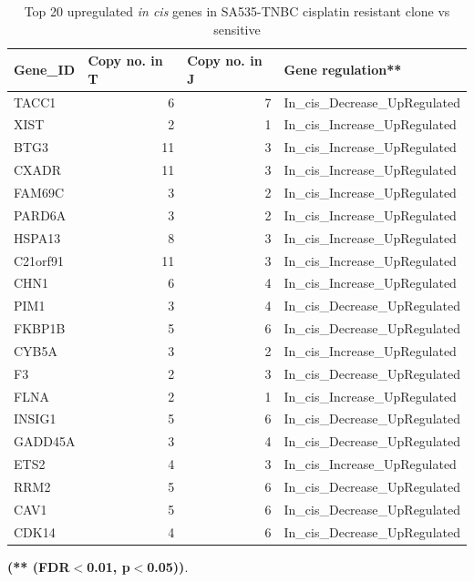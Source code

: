 
 \begin{table}[htbp]
   \centering
   \caption{Top 20 upregulated \textit{in cis} genes in SA535-TNBC cisplatin resistant clone vs sensitive}
     \begin{tabular}{|l|r|r|l|}
     \hline
     \textbf{Gene\_ID} & \multicolumn{1}{|l|}{\textbf{Copy no. in T}} & \multicolumn{1}{|l|}{\textbf{Copy no. in J}} & \textbf{Gene regulation**} \\
     \hline
     TACC1 & 6 & 7 & In\_cis\_Decrease\_UpRegulated \\
     XIST & 2 & 1 & In\_cis\_Increase\_UpRegulated \\
     BTG3 & 11 & 3 & In\_cis\_Increase\_UpRegulated \\
     CXADR & 11 & 3 & In\_cis\_Increase\_UpRegulated \\
     FAM69C & 3 & 2 & In\_cis\_Increase\_UpRegulated \\
     PARD6A & 3 & 2 & In\_cis\_Increase\_UpRegulated \\
     HSPA13 & 8 & 3 & In\_cis\_Increase\_UpRegulated \\
     C21orf91 & 11 & 3 & In\_cis\_Increase\_UpRegulated \\
     CHN1 & 6 & 4 & In\_cis\_Increase\_UpRegulated \\
     PIM1 & 3 & 4 & In\_cis\_Decrease\_UpRegulated \\
     FKBP1B & 5 & 6 & In\_cis\_Decrease\_UpRegulated \\
     CYB5A & 3 & 2 & In\_cis\_Increase\_UpRegulated \\
     F3 & 2 & 3 & In\_cis\_Decrease\_UpRegulated \\
     FLNA & 2 & 1 & In\_cis\_Increase\_UpRegulated \\
     INSIG1 & 5 & 6 & In\_cis\_Decrease\_UpRegulated \\
     GADD45A & 3 & 4 & In\_cis\_Decrease\_UpRegulated \\
     ETS2 & 4 & 3 & In\_cis\_Increase\_UpRegulated \\
     RRM2 & 5 & 6 & In\_cis\_Decrease\_UpRegulated \\
     CAV1 & 5 & 6 & In\_cis\_Decrease\_UpRegulated \\
     CDK14 & 4 & 6 & In\_cis\_Decrease\_UpRegulated \\
     \hline
     \end{tabular}%
   \label{tab:top20SA535upregulatedcispl}%
 
   \small\textbf{(** (FDR$<$0.01, p$<$0.05))}.
 \end{table}%


